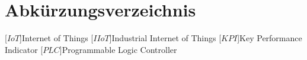 \clearpage
\chapter*{Abkürzungsverzeichnis}\label{abkuerzungsverzeichnis}
\begin{acronym}[YTM]
\setlength{\itemsep}{-\parsep}

[$IoT$]{\hspace{1cm}Internet of Things}
[$IIoT$]{\hspace{1cm}Industrial Internet of Things}
[$KPI$]{\hspace{1cm}Key Performance Indicator}
[$PLC$]{\hspace{1cm}Programmable Logic Controller}



\end{acronym}
